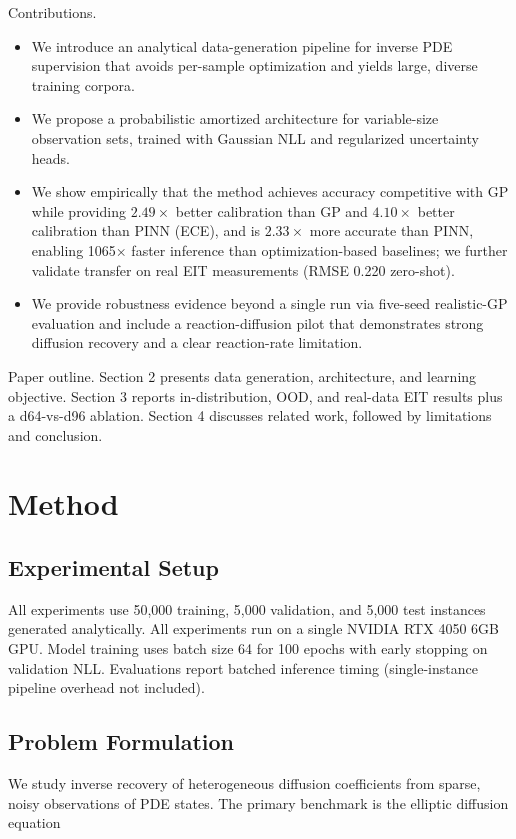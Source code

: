\documentclass{article}
\begin{document}
Contributions.

\begin{itemize}
\item We introduce an analytical data-generation pipeline for inverse PDE supervision that avoids per-sample optimization and yields large, diverse training corpora.

\item We propose a probabilistic amortized architecture for variable-size observation sets, trained with Gaussian NLL and regularized uncertainty heads.

\item We show empirically that the method achieves accuracy competitive with GP while providing $2.49\times$ better calibration than GP and $4.10\times$ better calibration than PINN (ECE), and is $2.33\times$ more accurate than PINN, enabling 1065× faster inference than optimization-based baselines; we further validate transfer on real EIT measurements (RMSE 0.220 zero-shot).

\item We provide robustness evidence beyond a single run via five-seed realistic-GP evaluation and include a reaction-diffusion pilot that demonstrates strong diffusion recovery and a clear reaction-rate limitation.
\end{itemize}

Paper outline. Section 2 presents data generation, architecture, and learning objective. Section 3 reports in-distribution, OOD, and real-data EIT results plus a d64-vs-d96 ablation. Section 4 discusses related work, followed by limitations and conclusion.

\section{Method}

\subsection{Experimental Setup}
All experiments use 50,000 training, 5,000 validation, and 5,000 test instances generated analytically. All experiments run on a single NVIDIA RTX 4050 6GB GPU. Model training uses batch size 64 for 100 epochs with early stopping on validation NLL. Evaluations report batched inference timing (single-instance pipeline overhead not included).

\subsection{Problem Formulation}
We study inverse recovery of heterogeneous diffusion coefficients from sparse, noisy observations of PDE states. The primary benchmark is the elliptic diffusion equation
\end{document}
